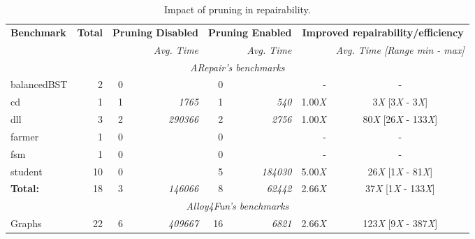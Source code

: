 \begin{table*}[ht]
\caption{Impact of pruning in repairability.}
\begin{center} 
\begin{small}
\begin{tabular}{|l|r|r|r|r|r|r|c|}
\hline
\rowcolor{black!25}
\cellcolor[gray]{.75}\textbf{Benchmark} & \cellcolor[gray]{.75}\textbf{Total} & \multicolumn{2}{c|}{\cellcolor[gray]{.75}\textbf{Pruning Disabled}} & \multicolumn{2}{c|}{ \cellcolor[gray]{.75}\textbf{Pruning Enabled}} & \multicolumn{2}{c|}{\cellcolor[gray]{.75}\textbf{Improved repairability/efficiency}}\\
%
\cellcolor[gray]{.75}{} & \cellcolor[gray]{.75}{\textbf{cases}} & \cellcolor[gray]{.75}{Repaired Cases} &\cellcolor[gray]{.75}\textit{Avg. Time} &\cellcolor[gray]{.75}{Repaired Cases} &\cellcolor[gray]{.75}\textit{Avg. Time} &\cellcolor[gray]{.75}{Repaired Cases} & \cellcolor[gray]{.75}\textit{Avg. Time \scriptsize{[Range min - max]}} \\
\hline
\multicolumn{8}{|c|}{\cellcolor[gray]{.90}\textit{\scriptsize{ARepair's benchmarks}}} \\
balancedBST & 2 & 0 & \textit{} & 0 & \textit{} & - & - \\ \hline
cd & 1 & 1 & \textit{1765} & 1 & \textit{540} & 1.00\scriptsize{\emph{X}} & 3\scriptsize{\emph{X}} [3\scriptsize{\emph{X}} - 3\scriptsize{\emph{X}}] \\ \hline
dll & 3 & 2 & \textit{290366} & 2 & \textit{2756} & 1.00\scriptsize{\emph{X}} & 80\scriptsize{\emph{X}} [26\scriptsize{\emph{X}} - 133\scriptsize{\emph{X}}] \\ \hline
farmer & 1 & 0 & \textit{} & 0 & \textit{} & - & - \\ \hline
fsm & 1 & 0 & \textit{} & 0 & \textit{} & - & - \\ \hline
student & 10 & 0 & \textit{} & 5 & \textit{184030} & 5.00\scriptsize{\emph{X}} & 26\scriptsize{\emph{X}} [1\scriptsize{\emph{X}} - 81\scriptsize{\emph{X}}] \\ \hline
\rowcolor{black!5}\textbf{Total:}  & 18 & 3 & \textit{146066} & 8 & \textit{62442} & 2.66\scriptsize{\emph{X}} & 37\scriptsize{\emph{X}} [1\scriptsize{\emph{X}} - 133\scriptsize{\emph{X}}] \\ \hline
\multicolumn{8}{|c|}{\cellcolor[gray]{.90}\textit{\scriptsize{Alloy4Fun's benchmarks}}} \\
Graphs & 22 & 6 & \textit{409667} & 16 & \textit{6821} & 2.66\scriptsize{\emph{X}} & 123\scriptsize{\emph{X}} [9\scriptsize{\emph{X}} - 387\scriptsize{\emph{X}}] \\ \hline

\end{tabular}
\end{small}
\end{center}
\end{table*}

